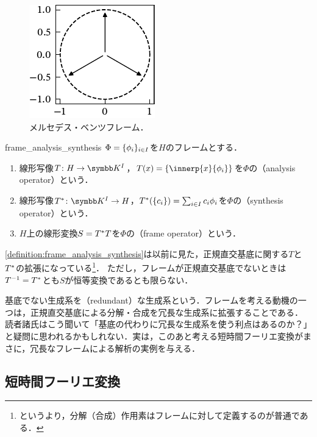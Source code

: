 \documentclass[../../main]{subfiles}
\begin{document}
\begin{figure}[htbp]
  \centering
  \includegraphics{figures/mercedes_benz.pdf}
  \caption{メルセデス・ベンツフレーム．}
\end{figure}

\begin{definition}{}{frame_analysis_synthesis}
  \(\Phi=\lbrace\phi_i\rbrace_{i\in I}\)を\(H\)のフレームとする．
  \begin{enumerate}
    \item 線形写像\(T\colon H\to\mapset{I}{\numset{K}}\)，\(T(x)=\seq{\innerp{x}{\phi_i}}\)を\(\Phi\)の（analysis operator）という．
    \item 線形写像\(\synth{T}\colon\mapset{I}{\numset{K}}\to H\)，\(T^{\mathord{\ast}}(\lbrace c_i\rbrace)=\sum_{i\in I}c_i\phi_i\)を\(\Phi\)の（synthesis operator）という．
    \item \(H\)上の線形変換\(S=T^{\mathord{\ast}}T\)を\(\Phi\)の（frame operator）という．
  \end{enumerate}
\end{definition}

\cref{definition:frame_analysis_synthesis}は以前に見た，正規直交基底に関する\(T\)と\(T^{\mathord{\ast}}\)の拡張になっている\footnote{というより，分解（合成）作用素はフレームに対して定義するのが普通である．}．
ただし，フレームが正規直交基底でないときは\(T^{-1}=T^{\mathord{\ast}}\)とも\(S\)が恒等変換であるとも限らない．

基底でない生成系を（redundant）な生成系という．フレームを考える動機の一つは，正規直交基底による分解・合成を冗長な生成系に拡張することである．
読者諸氏はこう聞いて「基底の代わりに冗長な生成系を使う利点はあるのか？」と疑問に思われるかもしれない．実は，このあと考える短時間フーリエ変換がまさに，冗長なフレームによる解析の実例を与える．

\subsection{短時間フーリエ変換}
\end{document}
